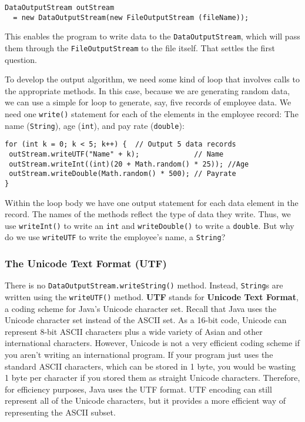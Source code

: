 \begin{jjjlisting}
\begin{lstlisting}
DataOutputStream outStream
  = new DataOutputStream(new FileOutputStream (fileName));
\end{lstlisting}
\end{jjjlisting}

\noindent This enables the program to write data to the {\tt DataOutputStream},
which will pass them through the {\tt FileOutputStream} to the
file itself.  That settles the first question.

To develop the output algorithm, we need some kind of loop that
involves calls to the appropriate methods.  In this case, because we are
generating random data, we can use a simple for loop to generate, say,
five records of employee data.  We need one {\tt write()} statement for
each of the elements in the employee record: The name ({\tt String}), age
({\tt int}), and pay rate ({\tt double}):

\begin{jjjlisting}
\begin{lstlisting}
for (int k = 0; k < 5; k++) {  // Output 5 data records
 outStream.writeUTF("Name" + k);             // Name
 outStream.writeInt((int)(20 + Math.random() * 25)); //Age
 outStream.writeDouble(Math.random() * 500); // Payrate
}
\end{lstlisting}
\end{jjjlisting}

\noindent Within the loop body we have one output statement for
each data element in the record.  The names of the methods reflect
the type of data they write.  Thus, we use {\tt writeInt()}
to write an {\tt int} and {\tt writeDouble()} to write a {\tt double}.
But why do we use {\tt writeUTF} to write the employee's
name, a {\tt String}?

\subsubsection*{The Unicode Text Format (UTF)}
\noindent There is no {\tt DataOutputStream.writeString()} method.  Instead,
{\tt String}s are written using the {\tt writeUTF()} method.   {\bf UTF}
stands for {\bf Unicode Text Format}, a coding scheme for Java's
Unicode character set.  Recall that Java uses the Unicode character set
instead of the ASCII set.  As a 16-bit code, Unicode can represent
8-bit ASCII characters plus a wide variety of Asian and other
international characters.  However, Unicode is not a very efficient
coding scheme if you aren't writing an international program.   If your
program just uses the standard ASCII characters, which can be stored
in 1 byte, you would be wasting 1 byte per character if you stored
them as straight Unicode characters.  Therefore, for efficiency
purposes, Java uses the UTF format.  UTF encoding can
still represent all of the Unicode characters, but it provides a more
efficient way of representing the ASCII subset.

